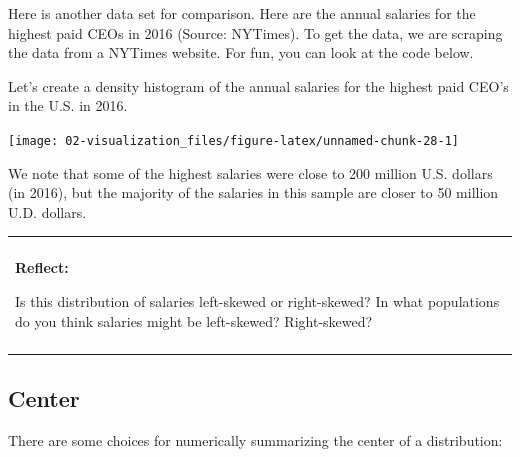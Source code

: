 \documentclass[
]{book}
\newenvironment{Shaded}{\begin{snugshade}}{\end{snugshade}}
\newcommand{\DataTypeTok}[1]{\textcolor[rgb]{0.13,0.29,0.53}{#1}}
\newcommand{\DecValTok}[1]{\textcolor[rgb]{0.00,0.00,0.81}{#1}}
\newcommand{\FloatTok}[1]{\textcolor[rgb]{0.00,0.00,0.81}{#1}}
\newcommand{\KeywordTok}[1]{\textcolor[rgb]{0.13,0.29,0.53}{\textbf{#1}}}
\newcommand{\NormalTok}[1]{#1}
\newcommand{\OperatorTok}[1]{\textcolor[rgb]{0.81,0.36,0.00}{\textbf{#1}}}
\newcommand{\StringTok}[1]{\textcolor[rgb]{0.31,0.60,0.02}{#1}}
\newenvironment{reflect}
{
    \begin{center}
    
    \begin{tabular}{|p{0.8\textwidth}|}
    \rowcolor{LightBlue}
    \hline\\
    \rowcolor{LightBlue}
    \textbf{Reflect:}
}
{
    \\\rowcolor{LightBlue}
    \\\hline
    \end{tabular} 
    \end{center}
}
\begin{document}
Here is another data set for comparison. Here are the annual salaries for the highest paid CEOs in 2016 (Source: NYTimes). To get the data, we are scraping the data from a NYTimes website. For fun, you can look at the code below.

Let's create a density histogram of the annual salaries for the highest paid CEO's in the U.S. in 2016.

\begin{Shaded}
\end{Shaded}

\begin{center}\texttt{[image: 02-visualization\_files/figure-latex/unnamed-chunk-28-1]} \end{center}

We note that some of the highest salaries were close to 200 million U.S. dollars (in 2016), but the majority of the salaries in this sample are closer to 50 million U.D. dollars.

\begin{reflect}
Is this distribution of salaries left-skewed or right-skewed? In what
populations do you think salaries might be left-skewed? Right-skewed?
\end{reflect}

\hypertarget{center}{%
\subsection{Center}\label{center}}

There are some choices for numerically summarizing the center of a distribution:
\end{document}
